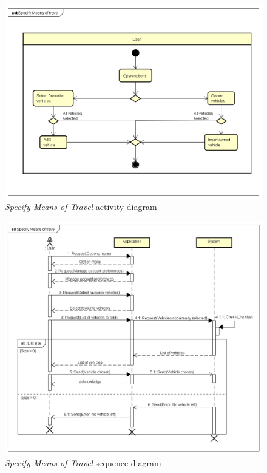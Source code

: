 \begin{figure}[h]
	\includegraphics[width=\textheight, height=\textwidth, angle=90, keepaspectratio=true]{Img/SpecifyMeansofTravelAC}
	\caption{\emph{Specify Means of Travel} activity diagram}
	\label{fig:SpecifyMeansofTravelAC}
\end{figure}

\begin{figure}
	\includegraphics[width=\textheight, height=\textwidth, angle=90, keepaspectratio=true]{Img/SpecifyMeansofTravelSQ}
	\caption{\emph{Specify Means of Travel} sequence diagram}
	\label{fig:SpecifyMeansofTravelSQ}
\end{figure}


